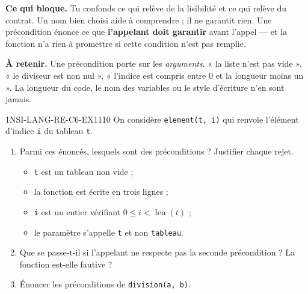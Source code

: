 

\textbf{Ce qui bloque.} Tu confonds ce qui relève de la lisibilité et ce qui relève du
contrat. Un nom bien choisi aide à comprendre ; il ne garantit rien. Une précondition énonce
ce que \textbf{l'appelant doit garantir} avant l'appel — et la fonction n'a rien à promettre
si cette condition n'est pas remplie.

\textbf{À retenir.} Une précondition porte sur les \emph{arguments}. « la liste n'est pas
vide », « le diviseur est non nul », « l'indice est compris entre $0$ et la longueur moins
un ». La longueur du code, le nom des variables ou le style d'écriture n'en sont jamais.

\begin{exercice}{1NSI-LANG-RE-C6-EX1}{1}{10}
On considère \lstinline{element(t, i)} qui renvoie l'élément d'indice \lstinline{i} du
tableau \lstinline{t}.
\begin{enumerate}
  \item Parmi ces énoncés, lesquels sont des préconditions ? Justifier chaque rejet.
        \begin{itemize}
          \item \lstinline{t} est un tableau non vide ;
          \item la fonction est écrite en trois lignes ;
          \item \lstinline{i} est un entier vérifiant $0 \leq i < \operatorname{len}(t)$ ;
          \item le paramètre s'appelle \lstinline{t} et non \lstinline{tableau}.
        \end{itemize}
  \item Que se passe-t-il si l'appelant ne respecte pas la seconde précondition ?
        La fonction est-elle fautive ?
  \item Énoncer les préconditions de \lstinline{division(a, b)}.
\end{enumerate}
\end{exercice}


